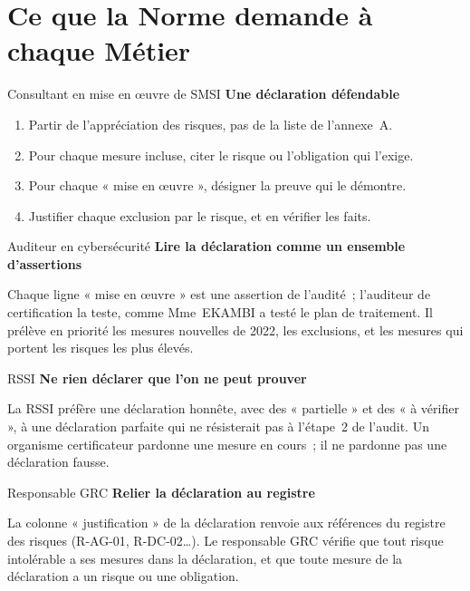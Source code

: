 \section{Ce que la Norme demande à chaque Métier}
\label{sec:c08-metiers}

\begin{boxmetier}{Consultant en mise en œuvre de SMSI}
\textbf{Une déclaration défendable}
\begin{enumerate}
    \item Partir de l'appréciation des risques, pas de la liste de
          l'annexe~A.
    \item Pour chaque mesure incluse, citer le risque ou l'obligation qui
          l'exige.
    \item Pour chaque « mise en œuvre », désigner la preuve qui le
          démontre.
    \item Justifier chaque exclusion par le risque, et en vérifier les
          faits.
\end{enumerate}
\end{boxmetier}

\begin{boxmetier}{Auditeur en cybersécurité}
\textbf{Lire la déclaration comme un ensemble d'assertions}

Chaque ligne « mise en œuvre » est une assertion de l'audité~; l'auditeur
de certification la teste, comme Mme~EKAMBI a testé le plan de traitement.
Il prélève en priorité les mesures nouvelles de 2022, les exclusions, et
les mesures qui portent les risques les plus élevés.
\end{boxmetier}

\begin{boxmetier}{RSSI}
\textbf{Ne rien déclarer que l'on ne peut prouver}

La RSSI préfère une déclaration honnête, avec des « partielle » et des
« à vérifier », à une déclaration parfaite qui ne résisterait pas à
l'étape~2 de l'audit. Un organisme certificateur pardonne une mesure en
cours~; il ne pardonne pas une déclaration fausse.
\end{boxmetier}

\begin{boxmetier}{Responsable GRC}
\textbf{Relier la déclaration au registre}

La colonne « justification » de la déclaration renvoie aux références du
registre des risques (R-AG-01, R-DC-02\ldots). Le responsable GRC vérifie
que tout risque intolérable a ses mesures dans la déclaration, et que toute
mesure de la déclaration a un risque ou une obligation.
\end{boxmetier}

